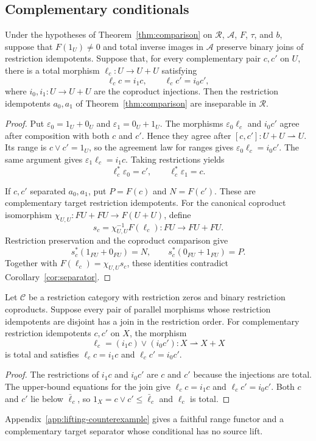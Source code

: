 \subsection{Complementary conditionals}

\begin{corollary}
\label{cor:source-conditionals}
Under the hypotheses of Theorem~\ref{thm:comparison} on
$\mathscr R$, $\mathcal A$, $F$, $\tau$, and $b$, suppose that
$F(1_U)\ne0$ and total inverse images in $\mathcal A$ preserve
binary joins of restriction idempotents.
Suppose that, for every complementary pair $c,c'$ on $U$, there
is a total morphism $\ell_c:U\to U+U$ satisfying
\[
 \ell_cc=i_1c,\qquad \ell_cc'=i_0c',
\]
where $i_0,i_1:U\to U+U$ are the coproduct injections.
Then the restriction idempotents $a_0,a_1$ of
Theorem~\ref{thm:comparison} are inseparable in $\mathscr R$.
\end{corollary}
\begin{proof}
Put $\varepsilon_0=1_U+0_U$ and $\varepsilon_1=0_U+1_U$.
The morphisms $\varepsilon_0\ell_c$ and $i_0c'$ agree after
composition with both $c$ and $c'$. Hence they agree after
$[c,c']:U+U\rightharpoonup U$. Its range is
$c\vee c'=1_U$, so the agreement law for ranges gives
$\varepsilon_0\ell_c=i_0c'$.
The same argument gives $\varepsilon_1\ell_c=i_1c$.
Taking restrictions yields
\[
 \ell_c^*\varepsilon_0=c',\qquad
 \ell_c^*\varepsilon_1=c.
\]

If $c,c'$ separated $a_0,a_1$, put $P=F(c)$ and $N=F(c')$.
These are complementary target restriction idempotents.
For the canonical coproduct isomorphism
$\chi_{U,U}:FU+FU\to F(U+U)$, define
\[
 s_c=\chi_{U,U}^{-1}F(\ell_c):FU\to FU+FU.
\]
Restriction preservation and the coproduct comparison give
\[
 s_c^*(1_{FU}+0_{FU})=N,\qquad
 s_c^*(0_{FU}+1_{FU})=P.
\]
Together with $F(\ell_c)=\chi_{U,U}s_c$, these identities contradict
Corollary~\ref{cor:separator}.
\end{proof}

\begin{proposition}\label{prop:disjoint-joins}
Let $\mathcal C$ be a restriction category with restriction zeros and
binary restriction coproducts. Suppose every pair of parallel morphisms
whose restriction idempotents are disjoint has a join in the restriction
order.
For complementary restriction idempotents $c,c'$ on $X$, the morphism
\[
 \ell_c=(i_1c)\vee(i_0c'):X\rightharpoonup X+X
\]
is total and satisfies $\ell_cc=i_1c$ and $\ell_cc'=i_0c'$.
\end{proposition}
\begin{proof}
The restrictions of $i_1c$ and $i_0c'$ are $c$ and $c'$ because
the injections are total. The upper-bound equations for the join
give $\ell_cc=i_1c$ and $\ell_cc'=i_0c'$.
Both $c$ and $c'$ lie below $\bar\ell_c$, so
$1_X=c\vee c'\le\bar\ell_c$ and $\ell_c$ is total.
\end{proof}

Appendix~\ref{app:lifting-counterexample} gives a faithful range functor
and a complementary target separator whose conditional has no source lift.
